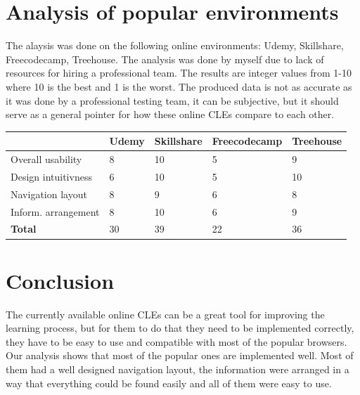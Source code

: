 \documentclass[10pt,english,a4paper]{article}
\begin{document}
\section{Analysis of popular environments}\label{analysis}
The alaysis was done on the following online environments: Udemy, Skillshare, Freecodecamp, Treehouse.
The analysis was done by myself due to lack of resources for hiring a professional team. The results are integer values
from 1-10 where 10 is the best and 1 is the worst. The produced data is not as accurate as it was done
by a professional testing team, it can be subjective, but it should serve as a general pointer for
how these online CLEs compare to each other.


\begin{center}
    \begin{tabular}{|l|l|l|l|l|}
    \hline
                            & \textbf{Udemy} & \textbf{Skillshare} & \textbf{Freecodecamp} & \textbf{Treehouse} \\ \hline
    Overall usability       & 8              & 10                  & 5                     & 9                  \\ \hline
    Design intuitivness     & 6              & 10                  & 5                     & 10                 \\ \hline
    Navigation layout       & 8              & 9                   & 6                     & 8                  \\ \hline
    Inform. arrangement     & 8              & 10                  & 6                     & 9                  \\ \hline
    \textbf{Total}          & 30             & 39                  & 22                    & 36                 \\ \hline
    \end{tabular}
\end{center}


\section{Conclusion}
The currently available online CLEs can be a great tool for improving the learning process, but for 
them to do that they need to be implemented correctly, they have to be easy to use and compatible 
with most of the popular browsers. Our analysis shows that most of the popular ones are
implemented well. Most of them had a well designed navigation layout, the information were arranged
in a way that everything could be found easily and all of them were easy to use.   
\end{document}
